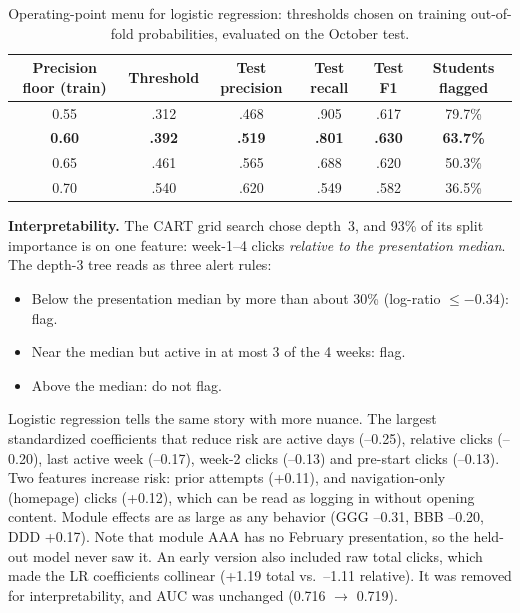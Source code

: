\documentclass[10pt,letterpaper]{article}
\begin{document}
\begin{table}[H]\centering\small
\caption{Operating-point menu for logistic regression: thresholds chosen on training out-of-fold probabilities, evaluated on the October test.}\label{tab:sens}
\begin{tabular}{@{}cccccc@{}}
\toprule
\textbf{Precision floor (train)} & \textbf{Threshold} & \textbf{Test precision} & \textbf{Test recall} & \textbf{Test F1} & \textbf{Students flagged} \\ \midrule
0.55 & .312 & .468 & .905 & .617 & 79.7\% \\
\textbf{0.60} & \textbf{.392} & \textbf{.519} & \textbf{.801} & \textbf{.630} & \textbf{63.7\%} \\
0.65 & .461 & .565 & .688 & .620 & 50.3\% \\
0.70 & .540 & .620 & .549 & .582 & 36.5\% \\
\bottomrule
\end{tabular}
\end{table}

\textbf{Interpretability.} The CART grid search chose depth~3, and 93\% of its split importance is on one feature:
week-1--4 clicks \emph{relative to the presentation median}. The depth-3 tree reads as three alert rules:
\begin{itemize}
\item Below the presentation median by more than about 30\% (log-ratio $\le -0.34$): flag.
\item Near the median but active in at most 3 of the 4 weeks: flag.
\item Above the median: do not flag.
\end{itemize}
Logistic regression tells the same story with more nuance. The largest standardized coefficients that reduce risk
are active days (--0.25), relative clicks (--0.20), last active week (--0.17), week-2 clicks (--0.13) and
pre-start clicks (--0.13). Two features increase risk: prior attempts (+0.11), and navigation-only (homepage)
clicks (+0.12), which can be read as logging in without opening content. Module effects are as large as any
behavior (GGG --0.31, BBB --0.20, DDD +0.17). Note that module AAA has no February presentation, so the
held-out model never saw it. An early version also included raw total clicks, which made the LR coefficients
collinear (+1.19 total vs.\ --1.11 relative). It was removed for interpretability, and AUC was unchanged
(0.716 $\rightarrow$ 0.719).
\end{document}
